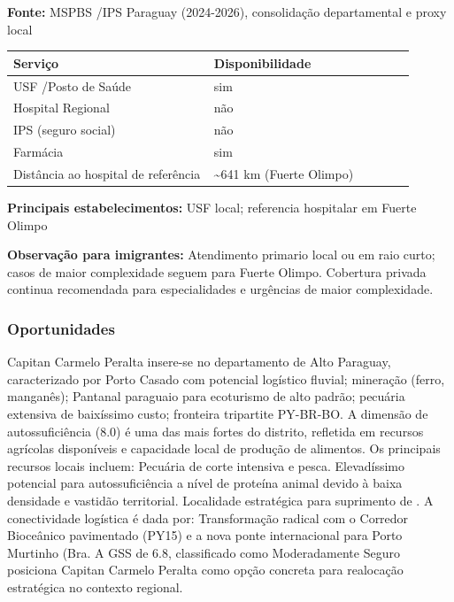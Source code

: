 \textbf{Fonte:} MSPBS /\allowbreak  IPS Paraguay (2024-2026), consolidação
departamental e proxy local

{\def\LTcaptype{none} %
\begin{longtable}{@{}>{\raggedright\arraybackslash}p{0.45\linewidth} >{\raggedright\arraybackslash}p{0.45\linewidth}@{}}
\toprule\noalign{}
Serviço & Disponibilidade \\
\midrule\noalign{}
\endhead
\bottomrule\noalign{}
\endlastfoot
USF /\allowbreak  Posto de Saúde & sim \\
Hospital Regional & não \\
IPS (seguro social) & não \\
Farmácia & sim \\
Distância ao hospital de referência & \textasciitilde641 km (Fuerte
Olimpo) \\
\end{longtable}
}

\textbf{Principais estabelecimentos:} USF local; referencia hospitalar
em Fuerte Olimpo

\textbf{Observação para imigrantes:} Atendimento primario local ou em
raio curto; casos de maior complexidade seguem para Fuerte Olimpo.
Cobertura privada continua recomendada para especialidades e urgências
de maior complexidade.
\newpage

\subsubsection*{Oportunidades}\label{oport-capitan-carmelo-peralta-1705}
Capitan Carmelo Peralta insere-se no departamento de Alto Paraguay, caracterizado por Porto Casado com potencial logístico fluvial; mineração (ferro, manganês); Pantanal paraguaio para ecoturismo de alto padrão; pecuária extensiva de baixíssimo custo; fronteira tripartite PY-BR-BO. A dimensão de autossuficiência (8.0) é uma das mais fortes do distrito, refletida em recursos agrícolas disponíveis e capacidade local de produção de alimentos. Os principais recursos locais incluem: Pecuária de corte intensiva e pesca. Elevadíssimo potencial para autossuficiência a nível de proteína animal devido à baixa densidade e vastidão territorial. Localidade estratégica para suprimento de . A conectividade logística é dada por: Transformação radical com o Corredor Bioceânico pavimentado (PY15) e a nova ponte internacional para Porto Murtinho (Bra. A GSS de 6.8, classificado como Moderadamente Seguro posiciona Capitan Carmelo Peralta como opção concreta para realocação estratégica no contexto regional.

